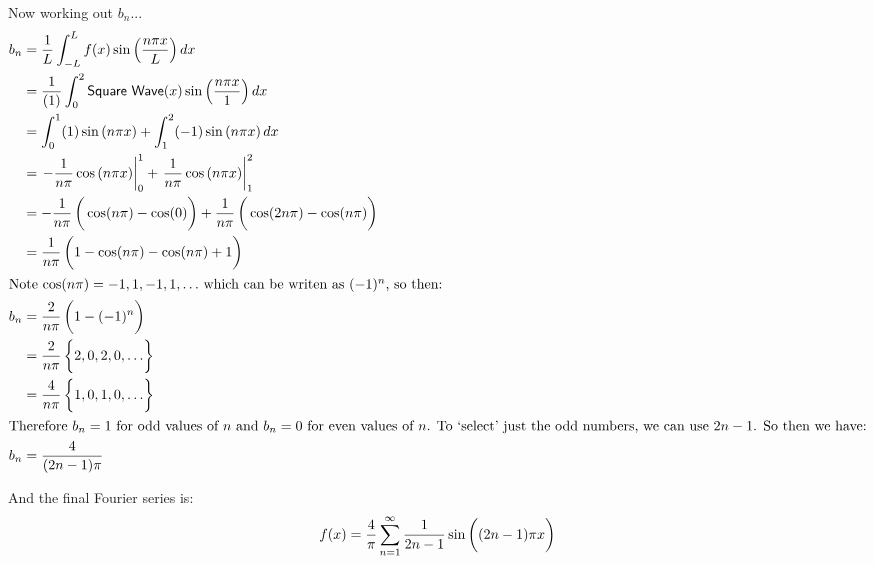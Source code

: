 \documentclass[11pt,letterpaper,twoside]{book}
\begin{document}
Now working out $b_n$...
\begin{align*}
b_n &= \frac{1}{L} \int_{-L}^L f(x) \sin \left( \frac{n\pi x}{L} \right) dx \\
    &= \frac{1}{(1)} \int_0^2 \mathsf{Square\ Wave}(x) \sin \left( \frac{n\pi x}{1} \right) dx \\
    &= \int_0^1 (1) \sin \left( n\pi x \right) + \int_1^2 (-1) \sin \left( n\pi x \right) dx \\
    &= \left. -\frac{1}{n \pi} \cos \left( n\pi x \right)\right|^1_0 + \left. \frac{1}{n \pi} \cos \left( n\pi x \right)\right|^2_1 \\
    &= -\frac{1}{n \pi} \left( \vphantom{\frac{1}{2}} \cos ( n\pi ) - \cos ( 0 ) \right) + \frac{1}{n \pi} \left( \vphantom{\frac{1}{2}} \cos(2n\pi) - \cos(n\pi) \right) \\ 
    &= \frac{1}{n \pi} \left( \vphantom{\frac{1}{2}} 1 - \cos(n\pi) - \cos(n\pi) + 1\right) \\
\intertext{Note $\cos(n\pi) = -1, 1, -1, 1, \ldots$\ which can be writen as $(-1)^n$, so then: }
b_n &= \frac{2}{n \pi} \left( \vphantom{\frac{1}{2}} 1 - (-1)^n \right) \\
    &= \frac{2}{n \pi} \left\{ \vphantom{\frac{1}{2}} 2, 0, 2, 0, \ldots \right\} \\
    &= \frac{4}{n \pi} \left\{ \vphantom{\frac{1}{2}} 1, 0, 1, 0, \ldots \right\} \\
\intertext{Therefore $b_n = 1$ for odd values of $n$ and $b_n = 0$ for even values of $n$.  To `select' just the odd numbers, we can use $2n - 1$.  So then we have:} 
b_n &= \frac{4}{(2n - 1)\pi} 
\end{align*}

And the final Fourier series is:
\[
f(x) = \frac{4}{\pi} \sum^\infty_{n = 1} \frac{1}{2n - 1} \sin \left( (2n - 1) \pi \vphantom{\frac{1}{2}} x \right)
\]

\lipsum[16-17]
\end{document}
